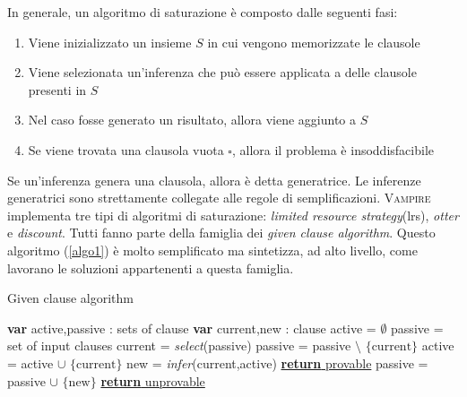 In generale, un algoritmo di saturazione è composto dalle seguenti fasi:
\begin{enumerate}
    \item Viene inizializzato un insieme $S$ in cui vengono memorizzate le clausole
    \item Viene selezionata un'inferenza che può essere applicata a delle clausole presenti in $S$
    \item Nel caso fosse generato un risultato, allora viene aggiunto a $S$
    \item Se viene trovata una clausola vuota $\square$, allora il problema è insoddisfacibile
\end{enumerate}
Se un'inferenza genera una clausola, allora è detta generatrice. Le inferenze generatrici 
sono strettamente collegate alle regole di semplificazioni.
\textsc{Vampire} implementa tre tipi di algoritmi di saturazione: \emph{limited resource strategy}(lrs), \emph{otter} e \emph{discount}.
Tutti fanno parte della famiglia dei \emph{given clause algorithm}. Questo algoritmo (\ref{algo1}) è molto semplificato ma sintetizza, ad alto livello, come lavorano le soluzioni appartenenti 
a questa famiglia. 
\begin{algorithm}
    \caption{Given clause algorithm}
    \begin{algorithmic}
        \State \textbf{var} active,passive : sets of clause 
        \State \textbf{var} current,new : clause
        \State active = $\emptyset$
        \State passive = set of input clauses
            \State current = \emph{select}(passive)
            \State passive = passive $\setminus$ $\{\text{current}\}$
            \State active = active $\cup$ $\{\text{current}\}$
            \State new = \emph{infer}(current,active)
                \State \underline{\textbf{return} provable}
            \EndIf
            \State passive = passive $\cup$ $\{\text{new}\}$ 
        \EndWhile
        \State \underline{\textbf{return} unprovable}
    \end{algorithmic}
    \label{algo1}
\end{algorithm}

